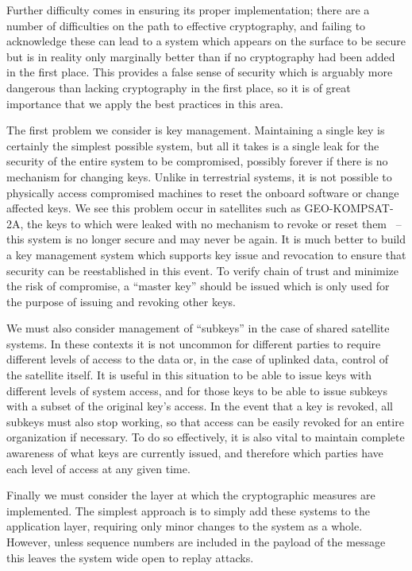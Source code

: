 Further difficulty comes in ensuring its proper implementation; there are a number of difficulties on the path to effective cryptography, and failing to acknowledge these can lead to a system which appears on the surface to be secure but is in reality only marginally better than if no cryptography had been added in the first place.
This provides a false sense of security which is arguably more dangerous than lacking cryptography in the first place, so it is of great importance that we apply the best practices in this area.

The first problem we consider is key management.
Maintaining a single key is certainly the simplest possible system, but all it takes is a single leak for the security of the entire system to be compromised, possibly forever if there is no mechanism for changing keys.
Unlike in terrestrial systems, it is not possible to physically access compromised machines to reset the onboard software or change affected keys.
We see this problem occur in satellites such as GEO-KOMPSAT-2A, the keys to which were leaked with no mechanism to revoke or reset them~\cite{xrit-rx} -- this system is no longer secure and may never be again.
It is much better to build a key management system which supports key issue and revocation to ensure that security can be reestablished in this event.
To verify chain of trust and minimize the risk of compromise, a ``master key'' should be issued which is only used for the purpose of issuing and revoking other keys.

We must also consider management of ``subkeys'' in the case of shared satellite systems.
In these contexts it is not uncommon for different parties to require different levels of access to the data or, in the case of uplinked data, control of the satellite itself.
It is useful in this situation to be able to issue keys with different levels of system access, and for those keys to be able to issue subkeys with a subset of the original key's access.
In the event that a key is revoked, all subkeys must also stop working, so that access can be easily revoked for an entire organization if necessary.
To do so effectively, it is also vital to maintain complete awareness of what keys are currently issued, and therefore which parties have each level of access at any given time.

Finally we must consider the layer at which the cryptographic measures are implemented.
The simplest approach is to simply add these systems to the application layer, requiring only minor changes to the system as a whole.
However, unless sequence numbers are included in the payload of the message this leaves the system wide open to replay attacks.

